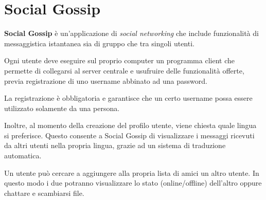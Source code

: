 \section{Social Gossip}
\textbf{Social Gossip} è un'applicazione di \textit{social networking} che include funzionalità di messaggistica istantanea sia di gruppo che tra singoli utenti.

Ogni utente deve eseguire sul proprio computer un programma client che permette di collegarsi al server centrale e usufruire delle funzionalità offerte, previa registrazione di uno username abbinato ad una password.

La registrazione è obbligatoria e garantisce che un certo username possa essere utilizzato solamente da una persona.

\medskip 
\noindent Inoltre, al momento della creazione del profilo utente, viene chiesta quale lingua si preferisce. Questo consente a Social Gossip di visualizzare i messaggi ricevuti da altri utenti nella propria lingua, grazie ad un sistema di traduzione automatica.

Un utente può cercare a aggiungere alla propria lista di amici un altro utente. In questo modo i due potranno visualizzare lo stato (online/offline) dell'altro oppure chattare e scambiarsi file.